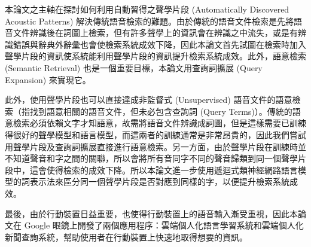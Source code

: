 \NTUtitlepage  %

\newpage
\setcounter{page}{1}

\NTUoralpage  %

\mydoublespacing

\begin{zhAbstract}  %
本論文之主軸在探討如何利用自動習得之聲學片段 (Automatically Discovered Acoustic Patterns) 解決傳統語音檢索的難題。由於傳統的語音文件檢索是先將語音文件辨識後在詞圖上檢索，但有許多聲學上的資訊會在辨識之中流失，或是有辨識錯誤與辭典外辭彙也會使檢索系統成效下降，因此本論文首先試圖在檢索時加入聲學片段的資訊使系統能利用聲學片段的資訊提升檢索系統成效。此外，語意檢索 (Semantic Retrieval)
也是一個重要目標，本論文用查詢詞擴展 (Query Expansion) 來實現它。

此外，使用聲學片段也可以直接達成非監督式 (Unsupervised) 語音文件的語意檢索（指找到語意相關的語音文件，但未必包含查詢詞 (Query Terms)）。傳統的語意檢索必須依賴文字才知語意，故需將語音文件辨識成詞圖，但是這樣需要已訓練得很好的聲學模型和語言模型，而這兩者的訓練通常是非常昂貴的，因此我們嘗試用聲學片段及查詢詞擴展直接進行語意檢索。另一方面，由於聲學片段在訓練時並不知道聲音和字之間的關聯，所以會將所有音同字不同的聲音歸類到同一個聲學片段中，這會使得檢索的成效下降。所以本論文進一步使用遞迴式類神經網路語言模型的詞表示法來區分同一個聲學片段是否對應到同樣的字，以便提升檢索系統成效。

最後，由於行動裝置日益重要，也使得行動裝置上的語音輸入漸受重視，因此本論文在 Google 眼鏡上開發了兩個應用程序：雲端個人化語言學習系統和雲端個人化新聞查詢系統，幫助使用者在行動裝置上快速地取得想要的資訊。

\end{zhAbstract}

{
\mysinglespacing\selectfont
\tableofcontents %

\listoffigures  %

\listoftables  %
\par
}

\newpage
\setcounter{page}{1}
